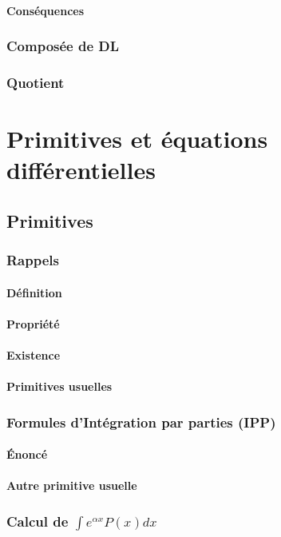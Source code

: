 \documentclass[12pt,a4paper,french]{book}
\begin{document}
			\subsubsection{Conséquences}
		\subsection{Composée de DL}
		\subsection{Quotient}
		
\chapter{Primitives et équations différentielles}
	\section{Primitives}
		\subsection{Rappels}
			\subsubsection{Définition}
			\subsubsection{Propriété}
			\subsubsection{Existence}
			\subsubsection{Primitives usuelles}
		\subsection{Formules d'Intégration par parties (IPP)}
			\subsubsection{Énoncé}
			\subsubsection{Autre primitive usuelle}
		\subsection{Calcul de $\int e^{\alpha x}P(x)dx$}
\end{document}
